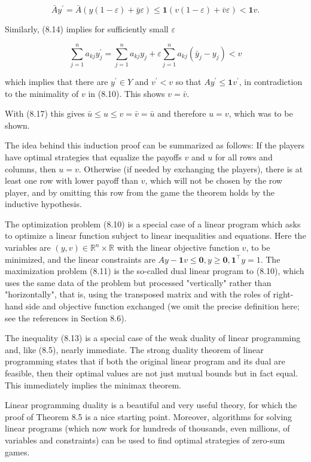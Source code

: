 \documentclass[12pt]{article}
\begin{document}
$$
\bar{A} y^{\prime}=\bar{A}(y(1-\varepsilon)+\bar{y} \varepsilon) \leq \mathbf{1}(v(1-\varepsilon)+\bar{v} \varepsilon)<\mathbf{1} v .
$$

Similarly, (8.14) implies for sufficiently small $\varepsilon$

$$
\sum_{j=1}^{n} a_{k j} y_{j}^{\prime}=\sum_{j=1}^{n} a_{k j} y_{j}+\varepsilon \sum_{j=1}^{n} a_{k j}\left(\bar{y}_{j}-y_{j}\right)<v
$$

which implies that there are $y^{\prime} \in Y$ and $v^{\prime}<v$ so that $A y^{\prime} \leq \mathbf{1} v^{\prime}$, in contradiction to the minimality of $v$ in (8.10). This shows $v=\bar{v}$.

With (8.17) this gives $\bar{u} \leq u \leq v=\bar{v}=\bar{u}$ and therefore $u=v$, which was to be shown.

The idea behind this induction proof can be summarized as follows: If the players have optimal strategies that equalize the payoffs $v$ and $u$ for all rows and columns, then $u=v$. Otherwise (if needed by exchanging the players), there is at least one row with lower payoff than $v$, which will not be chosen by the row player, and by omitting this row from the game the theorem holds by the inductive hypothesis.

The optimization problem (8.10) is a special case of a linear program which asks to optimize a linear function subject to linear inequalities and equations. Here the variables are $(y, v) \in \mathbb{R}^{n} \times \mathbb{R}$ with the linear objective function $v$, to be minimized, and the linear constraints are $A y-\mathbf{1} v \leq \mathbf{0}, y \geq \mathbf{0}, \mathbf{1}^{\top} y=1$. The maximization problem (8.11) is the so-called dual linear program to (8.10), which uses the same data of the problem but processed "vertically" rather than "horizontally", that is, using the transposed matrix and with the roles of right-hand side and objective function exchanged (we omit the precise definition here; see the references in Section 8.6).

The inequality (8.13) is a special case of the weak duality of linear programming and, like (8.5), nearly immediate. The strong duality theorem of linear programming states that if both the original linear program and its dual are feasible, then their optimal values are not just mutual bounds but in fact equal. This immediately implies the minimax theorem.

Linear programming duality is a beautiful and very useful theory, for which the proof of Theorem 8.5 is a nice starting point. Moreover, algorithms for solving linear programs (which now work for hundreds of thousands, even millions, of variables and constraints) can be used to find optimal strategies of zero-sum games.
\end{document}
